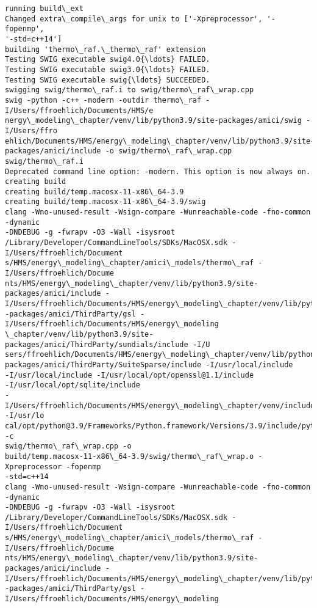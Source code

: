 \documentclass[11pt]{article}
\begin{document}
    \begin{Verbatim}[commandchars=\\\{\}]
running build\_ext
Changed extra\_compile\_args for unix to ['-Xpreprocessor', '-fopenmp',
'-std=c++14']
building 'thermo\_raf.\_thermo\_raf' extension
Testing SWIG executable swig4.0{\ldots} FAILED.
Testing SWIG executable swig3.0{\ldots} FAILED.
Testing SWIG executable swig{\ldots} SUCCEEDED.
swigging swig/thermo\_raf.i to swig/thermo\_raf\_wrap.cpp
swig -python -c++ -modern -outdir thermo\_raf -I/Users/ffroehlich/Documents/HMS/e
nergy\_modeling\_chapter/venv/lib/python3.9/site-packages/amici/swig -I/Users/ffro
ehlich/Documents/HMS/energy\_modeling\_chapter/venv/lib/python3.9/site-
packages/amici/include -o swig/thermo\_raf\_wrap.cpp swig/thermo\_raf.i
Deprecated command line option: -modern. This option is now always on.
creating build
creating build/temp.macosx-11-x86\_64-3.9
creating build/temp.macosx-11-x86\_64-3.9/swig
clang -Wno-unused-result -Wsign-compare -Wunreachable-code -fno-common -dynamic
-DNDEBUG -g -fwrapv -O3 -Wall -isysroot
/Library/Developer/CommandLineTools/SDKs/MacOSX.sdk -I/Users/ffroehlich/Document
s/HMS/energy\_modeling\_chapter/amici\_models/thermo\_raf -I/Users/ffroehlich/Docume
nts/HMS/energy\_modeling\_chapter/venv/lib/python3.9/site-packages/amici/include -
I/Users/ffroehlich/Documents/HMS/energy\_modeling\_chapter/venv/lib/python3.9/site
-packages/amici/ThirdParty/gsl -I/Users/ffroehlich/Documents/HMS/energy\_modeling
\_chapter/venv/lib/python3.9/site-packages/amici/ThirdParty/sundials/include -I/U
sers/ffroehlich/Documents/HMS/energy\_modeling\_chapter/venv/lib/python3.9/site-
packages/amici/ThirdParty/SuiteSparse/include -I/usr/local/include
-I/usr/local/include -I/usr/local/opt/openssl@1.1/include
-I/usr/local/opt/sqlite/include
-I/Users/ffroehlich/Documents/HMS/energy\_modeling\_chapter/venv/include -I/usr/lo
cal/opt/python@3.9/Frameworks/Python.framework/Versions/3.9/include/python3.9 -c
swig/thermo\_raf\_wrap.cpp -o
build/temp.macosx-11-x86\_64-3.9/swig/thermo\_raf\_wrap.o -Xpreprocessor -fopenmp
-std=c++14
clang -Wno-unused-result -Wsign-compare -Wunreachable-code -fno-common -dynamic
-DNDEBUG -g -fwrapv -O3 -Wall -isysroot
/Library/Developer/CommandLineTools/SDKs/MacOSX.sdk -I/Users/ffroehlich/Document
s/HMS/energy\_modeling\_chapter/amici\_models/thermo\_raf -I/Users/ffroehlich/Docume
nts/HMS/energy\_modeling\_chapter/venv/lib/python3.9/site-packages/amici/include -
I/Users/ffroehlich/Documents/HMS/energy\_modeling\_chapter/venv/lib/python3.9/site
-packages/amici/ThirdParty/gsl -I/Users/ffroehlich/Documents/HMS/energy\_modeling

\end{Verbatim}
\end{document}
